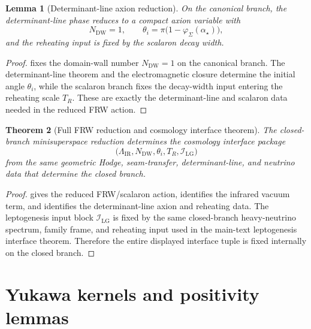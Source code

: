 \documentclass[11pt,a4paper]{article}
\newtheorem{theorem}{Theorem}[section]
\newtheorem{lemma}[theorem]{Lemma}
\theoremstyle{definition}
\theoremstyle{remark}
\newcommand{\phiseam}{\varphi_{\Sigma}}
\begin{document}
\begin{lemma}[Determinant-line axion reduction]
\label{lem:determinant-line-axion-reduction}
On the canonical branch, the determinant-line phase reduces to a compact axion variable with
\[
N_{\mathrm{DW}}=1,
\qquad
\theta_i=\pi\bigl(1-\phiseam(\alpha_\star)\bigr),
\]
and the reheating input is fixed by the scalaron decay width.
\end{lemma}

\begin{proof}
 fixes the domain-wall number $N_{\mathrm{DW}}=1$ on the
canonical branch. The determinant-line theorem and the electromagnetic closure determine the initial
angle $\theta_i$, while the scalaron branch fixes the decay-width input entering the reheating scale
$T_R$. These are exactly the determinant-line and scalaron data needed in the reduced FRW action.
\end{proof}

\begin{theorem}[Full FRW reduction and cosmology interface theorem]
\label{thm:full-frw-interface-theorem}
The closed-branch minisuperspace reduction determines the cosmology interface package
\[
\bigl(\Lambda_{\mathrm{IR}},N_{\mathrm{DW}},\theta_i,T_R,\mathcal I_{\mathrm{LG}}\bigr)
\]
from the same geometric Hodge, seam-transfer, determinant-line, and neutrino data that determine
the closed branch.
\end{theorem}

\begin{proof}
 gives the reduced FRW/scalaron action,
 identifies the infrared vacuum term, and
 identifies the determinant-line axion and reheating
data. The leptogenesis input block $\mathcal I_{\mathrm{LG}}$ is fixed by the same closed-branch
heavy-neutrino spectrum, family frame, and reheating input used in the main-text leptogenesis
interface theorem. Therefore the entire displayed interface tuple is fixed internally on the closed
branch.
\end{proof}

\section{Yukawa kernels and positivity lemmas}
\label{app:yukawa}
\end{document}
